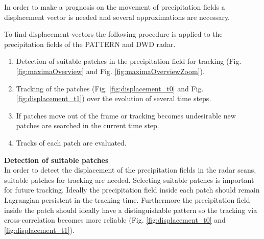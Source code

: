 \documentclass[11pt,twoside,a4paper,fleqn]{report}
\numberwithin{equation}{chapter}
\numberwithin{figure}{chapter}
\numberwithin{table}{chapter}
\begin{document}
In order to make a prognosis on the movement of precipitation fields a displacement vector is needed and several approximations are necessary. 

To find displacement vectors the following procedure is applied to the precipitation fields of the PATTERN and DWD radar.
\begin{enumerate}
	\item Detection of suitable patches in the precipitation field for tracking (Fig. \ref{fig:maximaOverview} and Fig. \ref{fig:maximaOverviewZoom}).
	\item Tracking of the patches (Fig. \ref{fig:displacement_t0} and Fig. \ref{fig:displacement_t1}) over the evolution of several time steps.
	\item If patches move out of the frame or tracking becomes undesirable new patches are searched in the current time step.
	\item Tracks of each patch are evaluated.
\end{enumerate}

\textbf{Detection of suitable patches} \\
In order to detect the displacement of the precipitation fields in the radar scans, suitable patches for tracking are needed. Selecting suitable patches is important for future tracking. Ideally the precipitation field inside each patch should remain Lagrangian persistent in the tracking time. Furthermore the precipitation field inside the patch should ideally have a distinguishable pattern so the  tracking via cross-correlation becomes more reliable (Fig. \ref{fig:displacement_t0} and \ref{fig:displacement_t1}). 
\end{document}
